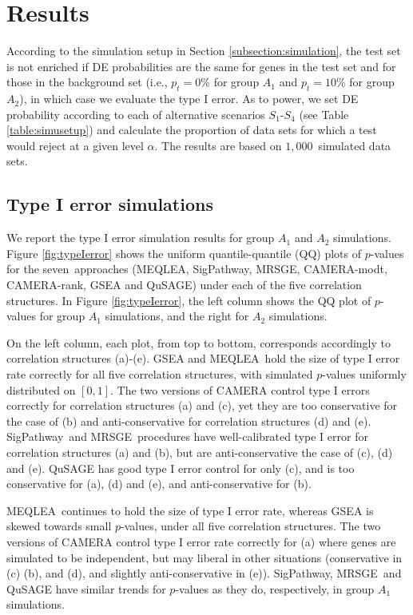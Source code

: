 \documentclass[useAMS,usenatbib, galley]{biom}
\newcommand{\OurMethod}{MEQLEA}
\newcommand{\aaCase}{a}
\newcommand{\aCase}{c}
\newcommand{\cCase}{b}
\newcommand{\eCase}{d}
\newcommand{\fCase}{e}
\newcommand{\CMR}{CAMERA-rank}
\newcommand{\CMT}{CAMERA-modt}
\newcommand{\gent}{SigPathway}
\newcommand{\genr}{MRSGE}
\newcommand{\HowmanySimu}{$1,000$}
\begin{document}
	
	\section{Results}\label{section:results}
	
	According to the simulation setup in Section \ref{subsection:simulation}, the test set is not enriched if DE probabilities are the same for genes in the test set and for those in the background set (i.e., $p_t =0\%$ for group $A_1$ and $p_t = 10\%$ for group $A_2$), in which case we evaluate the type I error. As to power, we set DE probability according to each of alternative scenarios $S_1$-$S_4$ (see Table \ref{table:simusetup}) and calculate the proportion of data sets for which a test would reject at a given level $\alpha$. The results are based on \HowmanySimu~simulated data sets. 
		
		

	\subsection{Type I error simulations}\label{subsection:typeIerror}

	We report the type I error simulation results for group $A_1$ and $A_2$ simulations. Figure \ref{fig:typeIerror} shows the uniform quantile-quantile (QQ) plots of $p$-values for the seven~approaches (\OurMethod, \gent, \genr, \CMT, \CMR, GSEA and QuSAGE) under each of the five correlation structures. In Figure \ref{fig:typeIerror}, the left column shows the QQ plot of $p$-values for group $A_1$ simulations, and the right for $A_2$ simulations. 
	
	On the left column, each plot, from top to bottom, corresponds accordingly to correlation structures (\aaCase)-(\fCase). GSEA and \OurMethod~hold the size of type I error rate correctly for all five correlation structures, with simulated $p$-values uniformly distributed on $[0, 1]$. The two versions of CAMERA control type I errors correctly for correlation structures (\aaCase) and (\aCase), yet they are too conservative for the case of (\cCase) and anti-conservative for correlation structures (\eCase) and (\fCase). \gent~and \genr~procedures have well-calibrated type I error for correlation structures (\aaCase) and (\cCase), but are anti-conservative the case of (\aCase), (\eCase) and (\fCase). QuSAGE has good type I error control for only (\aCase), and is too conservative for (\aaCase), (\eCase) and (\fCase), and anti-conservative for (\cCase).
	
	\OurMethod~continues to hold the size of type I error rate, whereas GSEA is skewed towards small $p$-values, under all five correlation structures. The two versions of CAMERA control type I error rate correctly for (\aaCase) where genes are simulated to be independent, but may liberal in other situations (conservative in (\aCase) (\cCase), and (\eCase), and slightly anti-conservative in (\fCase)). \gent, \genr~and QuSAGE have similar trends for $p$-values as they do, respectively, in group $A_1$ simulations.
	
\end{document}
